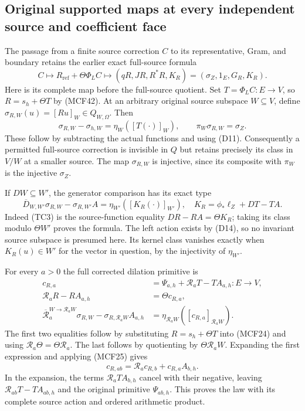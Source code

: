 
\subsection{Original supported maps at every independent source and coefficient face}

The passage from a finite source correction $C$ to its representative,
Gram, and boundary retains the earlier exact full-source formula
\[
C\longmapsto R_{\mathrm{ref}}+\Theta\Phi_LC
\longmapsto(qR,JR,R^*R,K_R)
=(\sigma_Z,1_E,G_R,K_R).
\tag{TC29}
\]
Here is its complete map before the full-source quotient.  Set
$T=\Phi_LC:E\to V$, so $R=s_h+\Theta T$ by (MCF42).  At an
arbitrary original source subspace $W\subseteq V$, define
$\sigma_{R,W}(u)=[Ru]_W\in Q_{W,\Omega}$.  Then
\[
\sigma_{R,W}-\sigma_{h,W}=\eta_W([T(\cdot)]_W),
\qquad \pi_W\sigma_{R,W}=\sigma_Z.
\tag{TC29a}
\]
These follow by subtracting the actual functions and using (D11).
Consequently a permitted full-source correction is invisible in
$Q$ but retains precisely its class in $V/W$ at a smaller source.
The map $\sigma_{R,W}$ is injective, since its composite with
$\pi_W$ is the injective $\sigma_Z$.

If $DW\subseteq W'$, the generator comparison has its exact type
\[
\overline D_{W,W'}\sigma_{R,W}-\sigma_{R,W'}A
      =\eta_{W'}([K_R(\cdot)]_{W'}),
\quad K_R=\phi_*\ell_Z+DT-TA.
\tag{TC29b}
\]
Indeed (TC3) is the source-function equality
$DR-RA=\Theta K_R$; taking its class modulo $\Theta W'$ proves
the formula.  The left action exists by (D14), so no invariant
source subspace is presumed here.  Its kernel class vanishes
exactly when $K_R(u)\in W'$ for the vector in question, by the
injectivity of $\eta_{W'}$.

For every $a>0$ the full corrected dilation primitive is
\[
\begin{split}
c_{R,a}&=\Psi_{a,h}+\mathcal R_aT-TA_{a,h}:E\to V,\\
\mathcal R_aR-RA_{a,h}&=\Theta c_{R,a},\\
\overline{\mathcal R}_a^{W\to\mathcal R_aW}\sigma_{R,W}
 -\sigma_{R,\mathcal R_aW}A_{a,h}
 &=\eta_{\mathcal R_aW}([c_{R,a}]_{\mathcal R_aW}).
\end{split}
\tag{TC29c}
\]
The first two equalities follow by substituting $R=s_h+\Theta T$
into (MCF24) and using $\mathcal R_a\Theta=\Theta\mathcal R_a$.
The last follows by quotienting by $\Theta\mathcal R_aW$.
Expanding the first expression and applying (MCF25) gives
\[
c_{R,ab}=\mathcal R_ac_{R,b}+c_{R,a}A_{b,h}.
\tag{TC29d}
\]
In the expansion, the terms $\mathcal R_aT A_{b,h}$ cancel
with their negative, leaving $\mathcal R_{ab}T-TA_{ab,h}$
and the original primitive $\Psi_{ab,h}$.  This proves the law
with its complete source action and ordered arithmetic product.

